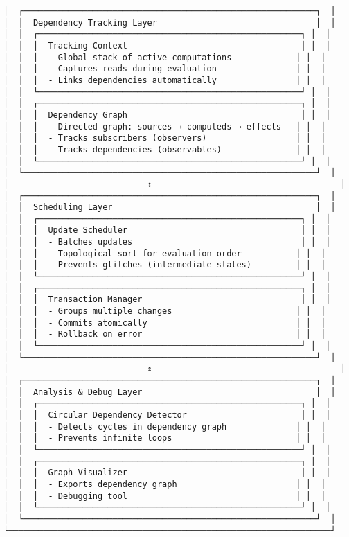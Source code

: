 \documentclass[11pt]{article}
\begin{document}
\begin{verbatim}
│  ┌───────────────────────────────────────────────────────────┐  │
│  │  Dependency Tracking Layer                                │  │
│  │  ┌─────────────────────────────────────────────────────┐ │  │
│  │  │  Tracking Context                                   │ │  │
│  │  │  - Global stack of active computations             │ │  │
│  │  │  - Captures reads during evaluation                │ │  │
│  │  │  - Links dependencies automatically                │ │  │
│  │  └─────────────────────────────────────────────────────┘ │  │
│  │  ┌─────────────────────────────────────────────────────┐ │  │
│  │  │  Dependency Graph                                   │ │  │
│  │  │  - Directed graph: sources → computeds → effects   │ │  │
│  │  │  - Tracks subscribers (observers)                  │ │  │
│  │  │  - Tracks dependencies (observables)               │ │  │
│  │  └─────────────────────────────────────────────────────┘ │  │
│  └───────────────────────────────────────────────────────────┘  │
│                            ↕                                      │
│  ┌───────────────────────────────────────────────────────────┐  │
│  │  Scheduling Layer                                         │  │
│  │  ┌─────────────────────────────────────────────────────┐ │  │
│  │  │  Update Scheduler                                   │ │  │
│  │  │  - Batches updates                                  │ │  │
│  │  │  - Topological sort for evaluation order           │ │  │
│  │  │  - Prevents glitches (intermediate states)         │ │  │
│  │  └─────────────────────────────────────────────────────┘ │  │
│  │  ┌─────────────────────────────────────────────────────┐ │  │
│  │  │  Transaction Manager                                │ │  │
│  │  │  - Groups multiple changes                         │ │  │
│  │  │  - Commits atomically                              │ │  │
│  │  │  - Rollback on error                               │ │  │
│  │  └─────────────────────────────────────────────────────┘ │  │
│  └───────────────────────────────────────────────────────────┘  │
│                            ↕                                      │
│  ┌───────────────────────────────────────────────────────────┐  │
│  │  Analysis & Debug Layer                                   │  │
│  │  ┌─────────────────────────────────────────────────────┐ │  │
│  │  │  Circular Dependency Detector                       │ │  │
│  │  │  - Detects cycles in dependency graph              │ │  │
│  │  │  - Prevents infinite loops                         │ │  │
│  │  └─────────────────────────────────────────────────────┘ │  │
│  │  ┌─────────────────────────────────────────────────────┐ │  │
│  │  │  Graph Visualizer                                   │ │  │
│  │  │  - Exports dependency graph                        │ │  │
│  │  │  - Debugging tool                                  │ │  │
│  │  └─────────────────────────────────────────────────────┘ │  │
│  └───────────────────────────────────────────────────────────┘  │
└─────────────────────────────────────────────────────────────────┘
\end{verbatim}
\end{document}

